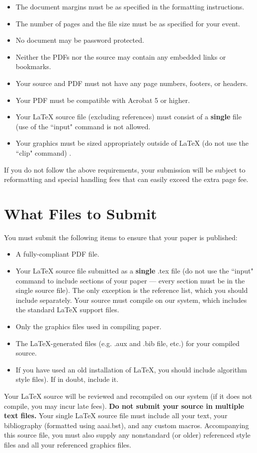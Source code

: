 \documentclass[letterpaper]{article} %
\begin{document}
\begin{itemize}
\item The document margins must be as specified in the formatting instructions.
\item The number of pages and the file size must be as specified for your event.
\item No document may be password protected.
\item Neither the PDFs nor the source may contain any embedded links or bookmarks.
\item Your source and PDF must not have any page numbers, footers, or headers.
\item Your PDF must be compatible with Acrobat 5 or higher.
\item Your \LaTeX{} source file (excluding references) must consist of a \textbf{single} file (use of the ``input" command is not allowed.
\item Your graphics must be sized appropriately outside of \LaTeX{} (do not use the ``clip" command) .
\end{itemize}

If you do not follow the above requirements, your submission will be subject to reformatting and special handling fees that can easily exceed the extra page fee.

\section{What Files to Submit}
You must submit the following items to ensure that your paper is published:
\begin{itemize}
\item A fully-compliant PDF file.
\item Your  \LaTeX{}  source file submitted as a \textbf{single} .tex file (do not use the ``input" command to include sections of your paper --- every section must be in the single source file). The only exception is the reference list, which you should include separately. Your source must compile on our system, which includes the standard \LaTeX{} support files.
\item Only the graphics files used in compiling paper.
\item The \LaTeX{}-generated files (e.g. .aux and .bib file, etc.) for your compiled source.
\item If you have used an old installation of \LaTeX{}, you should include algorithm style files). If in doubt, include it.
\end{itemize}

Your \LaTeX{} source will be reviewed and recompiled on our system (if it does not compile, you may incur late fees).   \textbf{Do not submit your source in multiple text files.} Your single \LaTeX{} source file must include all your text, your bibliography (formatted using aaai.bst), and any custom macros. Accompanying this source file, you must also supply any nonstandard (or older) referenced style files and all your referenced graphics files. 
\end{document}

